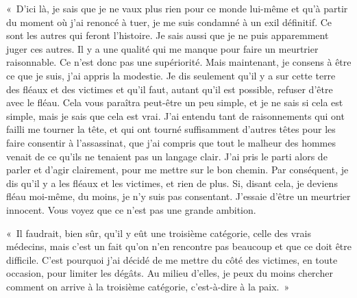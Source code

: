 \documentclass[french,twoside]{book} %
\begin{document}
« D’ici là, je sais que je ne vaux plus rien pour ce monde lui-même et qu’à partir du moment où j’ai renoncé à tuer, je me suis condamné à un exil définitif. Ce sont les autres qui feront l’histoire. Je sais aussi que je ne puis apparemment juger ces autres. Il y a une qualité qui me manque pour faire un meurtrier raisonnable. Ce n’est donc pas une supériorité. Mais maintenant, je consens à être ce que je suis, j’ai appris la modestie. Je dis seulement qu’il y a sur cette terre des fléaux et des victimes et qu’il faut, autant qu’il est possible, refuser d’être avec le fléau. Cela vous paraîtra peut-être un peu simple, et je ne sais si cela est simple, mais je sais que cela est vrai. J’ai entendu tant de raisonnements qui ont failli me tourner la tête, et qui ont tourné suffisamment d’autres têtes pour les faire consentir à l’assassinat, que j’ai compris que tout le malheur des hommes venait de ce qu’ils ne tenaient pas un langage clair. J’ai pris le parti alors de parler et d’agir clairement, pour me mettre sur le bon chemin. Par conséquent, je dis qu’il y a les fléaux et les victimes, et rien de plus. Si, disant cela, je deviens fléau moi-même, du moins, je n’y suis pas consentant. J’essaie d’être un meurtrier innocent. Vous voyez que ce n’est pas une grande ambition.\par
« Il faudrait, bien sûr, qu’il y eût une troisième catégorie, celle des vrais médecins, mais c’est un fait qu’on n’en rencontre pas beaucoup et que ce doit être difficile. C’est pourquoi j’ai décidé de me mettre du côté des victimes, en toute occasion, pour limiter les dégâts. Au milieu d’elles, je peux du moins chercher comment on arrive à la troisième catégorie, c’est-à-dire à la paix. »
\end{document}
